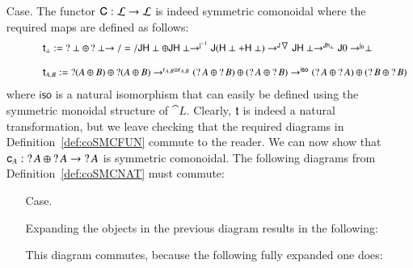 \begin{itemize}
\item[Case.] The functor $\func{C} : \cat{L} \mto \cat{L}$ is indeed
  symmetric comonoidal where the required maps are defined as follows:
  \[
  \small
  \begin{array}{lll}
    \quad\quad\quad\t_\perp := \wn \perp \oplus \wn \perp \mto/=/ \J\H\perp \oplus \J\H\perp \mto^{\jinv{}} \J(\H\perp + \H\perp) \mto^{\J\codiag{}} \J\H\perp \mto^{\J\h{\perp}} \J 0 \mto^{\j{0}} \perp\\
    \\
    \quad\quad\quad\t_{A,B} := \wn (A \oplus B) \oplus \wn (A \oplus B) \mto^{\r{A,B} \oplus \r{A,B}} (\wn A \oplus \wn B) \oplus (\wn A \oplus \wn B) \mto^{\iso} (\wn A \oplus \wn A) \oplus (\wn B \oplus \wn B)
  \end{array}
  \]
  where $\mathsf{iso}$ is a natural isomorphism that can easily be
  defined using the symmetric monoidal structure of
  $\cat{L}$. Clearly, $\t$ is indeed a natural transformation, but
  we leave checking that the required diagrams in
  Definition~\ref{def:coSMCFUN} commute to the reader.  We can now
  show that $\c{A} : \wn A \oplus \wn A \mto \wn A$ is symmetric
  comonoidal.  The following diagrams from
  Definition~\ref{def:coSMCNAT} must commute:
  \begin{itemize}
  \item[Case.] \ \\
    \begin{diagram}
    \end{diagram}
    Expanding the objects in the previous diagram results in the following:
    \begin{diagram}
    \end{diagram}
    This diagram commutes, because the following fully expanded one
    does:
    \begin{center}
\end{center}
\end{itemize}
\end{itemize}
